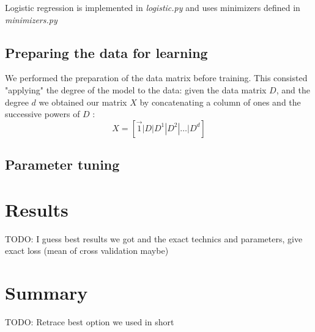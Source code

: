 \documentclass[10pt,conference,compsocconf]{IEEEtran}
\begin{document}
Logistic regression is implemented in \textit{logistic.py} and uses minimizers defined in \textit{minimizers.py}

\subsection{Preparing the data for learning}
We performed the preparation of the data matrix before training. This consisted "applying" the degree of the model to the data: given the data matrix $D$, and the degree $d$ we obtained our matrix $X$ by concatenating a column of ones and the successive powers of $D$ : $$X = [\vec{1} | D | D^1 | D^2 | \dots | D^d]$$

\subsection{Parameter tuning}
\section{Results}

TODO: I guess best results we got and the exact technics and parameters, give exact loss (mean of cross validation maybe)

\section{Summary}

TODO: Retrace best option we used in short



\end{document}
